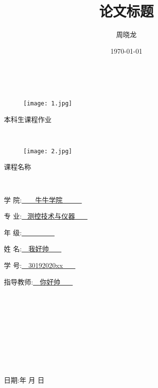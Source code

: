 \documentclass[lang=cn,11pt,a4paper,cite=authoryear]{elegantpaper}
\title{论文标题}
\author{周晓龙}
\date{\today}
\renewcommand{\today}{\number\year 年 \number\month 月 \number\day 日}
\begin{document}
\clearpage
\

\begin{figure}[htbp]
  \centering
  \texttt{[image: 1.jpg]}
\end{figure}

\begin{center}
{\heiti {} 本科生课程作业}
\end{center} 

\

\begin{figure}[htbp]
  \centering
  \texttt{[image: 2.jpg]}
\end{figure}

\begin{center}
{\heiti {} 课程名称}
\end{center} 

\

\begin{center}
{\heiti {} 学 \quad \quad 院:\quad \underline{\ \ \ \ \quad 牛牛学院 \quad  \ \ \ \ \ }}

{\heiti {} 专 \quad \quad 业:\quad \underline{ \ 测控技术与仪器 \ \ \ }}

{\heiti {} 年 \quad \quad 级:\quad \underline{\ \ \ \ \quad {} \quad \quad \ \ \ \ \ }}

{\heiti {} 姓 \quad \quad 名:\quad \underline{\ \ \quad \quad 我好帅 \quad \quad \ \ \ }}

{\heiti {} 学 \quad \quad 号:\quad \underline{\ \ \quad 30192020xx \quad \ \ \ }}

{\heiti {} 指导教师:\quad \underline{\ \ \quad \quad 你好帅 \quad \quad \ \ \ }}

\

\

\

\

\

{\heiti {} 日期:\quad \today}
\end{center} 
\clearpage

\maketitle
\end{document}
